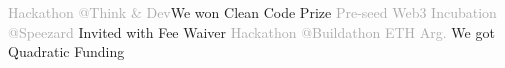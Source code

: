 
\begin{cvtable}

    {\textcolor{darkgray}
    {Hackathon @Think \& Dev}}{We won Clean Code Prize}{{%
    {
    } }}
%
    {\textcolor{darkgray}
    {Pre-seed Web3 Incubation @Speezard
  }}{Invited with Fee Waiver}{{%
    {
    } }}
%
    {\textcolor{darkgray}
    {Hackathon @Buildathon ETH Arg.
  }}{We got Quadratic Funding}{{%
    {
    } }}
\end{cvtable}

